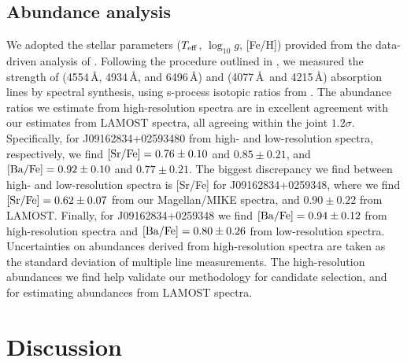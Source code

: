 \documentclass[a4paper,fleqn,usenatbib]{mnras}
\begin{document}
\subsection{Abundance analysis}
We adopted the stellar parameters ($T_{\rm eff}$, $\log_{10}g$, [Fe/H]) provided from the data-driven analysis of \citet{ho2017}. Following the procedure outlined in \citet{casey2014}, we measured the strength of  (4554\,\AA, 4934\,\AA, and 6496\,\AA) and  (4077\,\AA\ and 4215\,\AA) absorption lines by spectral synthesis, using s-process isotopic ratios from \citet{sneden08}. The abundance ratios we estimate from high-resolution spectra are in excellent agreement with our estimates from LAMOST spectra, all agreeing within the joint $1.2\sigma$. Specifically, for J09162834+02593480 from high- and low-resolution spectra, respectively, we find $[{\rm Sr/Fe}] = 0.76 \pm 0.10$ and $0.85 \pm 0.21$, and $[{\rm Ba/Fe}] = 0.92 \pm 0.10$ and $0.77 \pm 0.21$. The biggest discrepancy we find between high- and low-resolution spectra is [Sr/Fe] for J09162834+0259348, where we find $[{\rm Sr/Fe}] = 0.62 \pm 0.07$ from our Magellan/MIKE spectra, and $0.90 \pm 0.22$ from LAMOST. Finally, for J09162834+0259348 we find $[{\rm Ba/Fe}] = 0.94 \pm 0.12$ from high-resolution spectra and $[{\rm Ba/Fe}] = 0.80 \pm 0.26$ from low-resolution spectra. Uncertainties on abundances derived from high-resolution spectra are taken as the standard deviation of multiple line measurements. The high-resolution abundances we find help validate our methodology for candidate selection, and for estimating abundances from LAMOST spectra.



\section{Discussion}  \label{sec:dis}
\end{document}
